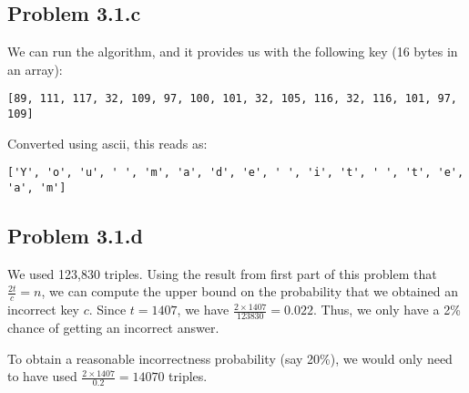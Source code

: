 \documentclass[psamsfonts]{amsart}
\begin{document}
\subsection{Problem 3.1.c}

We can run the algorithm, and it provides us with the following key (16 bytes in an array):
\begin{verbatim}
[89, 111, 117, 32, 109, 97, 100, 101, 32, 105, 116, 32, 116, 101, 97, 109]
\end{verbatim}

Converted using ascii, this reads as:
\begin{verbatim}
['Y', 'o', 'u', ' ', 'm', 'a', 'd', 'e', ' ', 'i', 't', ' ', 't', 'e', 'a', 'm']
\end{verbatim}

\subsection{Problem 3.1.d}

We used 123,830 triples. Using the result from first part of this problem that $\frac{2t}{c} = n$, we can compute the upper bound on the probability that we obtained an incorrect key $c$. Since $t = 1407$, we have $\frac{2 \times 1407}{123 830} = 0.022$. Thus, we only have a 2\% chance of getting an incorrect answer.

To obtain a reasonable incorrectness probability (say 20\%), we would only need to have used $\frac{2 \times 1407}{0.2} = 14070$ triples.
\end{document}
